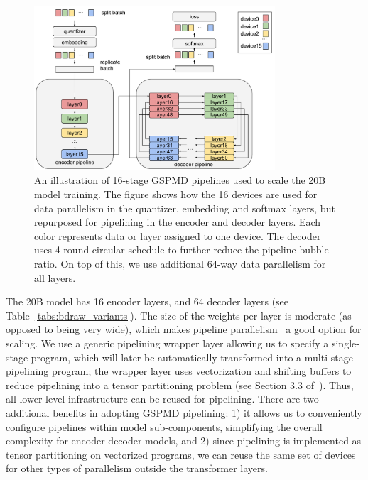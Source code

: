\begin{figure}[t]
    \centering
    \includegraphics[width=0.8\textwidth]{figures/pipeline.pdf}
    \caption{An illustration of 16-stage GSPMD pipelines used to scale the 20B model training. The figure shows how the 16 devices are used for data parallelism in the quantizer, embedding and softmax layers, but repurposed for pipelining in the encoder and decoder layers. Each color represents data or layer assigned to one device. The decoder uses 4-round circular schedule to further reduce the pipeline bubble ratio. On top of this, we use additional 64-way data parallelism for all layers.}
    \label{figs:pipeline}
\end{figure}


The 20B model has 16 encoder layers, and 64 decoder layers (see Table~\ref{tabs:bdraw_variants}). The size of the weights per layer is moderate (as opposed to being very wide), which makes pipeline parallelism~\cite{gpipe} a good option for scaling. We use a generic pipelining wrapper layer allowing us to specify a single-stage program, which will later be automatically transformed into a multi-stage pipelining program; the wrapper layer uses vectorization and shifting buffers to reduce pipelining into a tensor partitioning problem (see Section 3.3 of~\cite{xu2021gspmd}). Thus, all lower-level infrastructure can be reused for pipelining. There are two additional benefits in adopting GSPMD pipelining: 1) it allows us to conveniently configure pipelines within model sub-components, simplifying the overall complexity for encoder-decoder models, and 2) since pipelining is implemented as tensor partitioning on vectorized programs, we can reuse the same set of devices for other types of parallelism outside the transformer layers.

